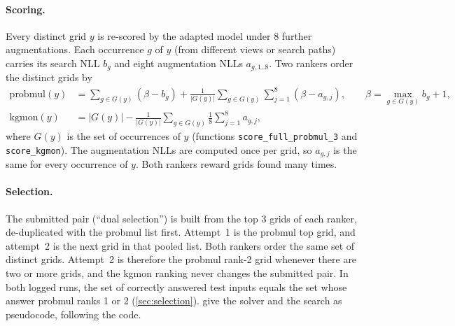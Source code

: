 \documentclass[11pt]{article}
\newcommand{\code}[1]{\texttt{#1}}
\begin{document}
\paragraph{Scoring.}
Every distinct grid $y$ is re-scored by the adapted model under 8 further augmentations. Each occurrence $g$ of $y$ (from different views or search paths) carries its search NLL $b_g$ and eight augmentation NLLs $a_{g,1..8}$.
Two rankers order the distinct grids by
\begin{align}
\text{probmul}(y) &= \sum_{g\in G(y)} (\beta - b_g) + \frac{1}{|G(y)|}\sum_{g\in G(y)}\sum_{j=1}^{8} (\beta - a_{g,j}), \qquad \beta = \max_{g\in G(y)} b_g + 1, \label{eq:probmul}\\
\text{kgmon}(y) &= |G(y)| - \frac{1}{|G(y)|}\sum_{g\in G(y)} \frac{1}{8}\sum_{j=1}^{8} a_{g,j}, \label{eq:kgmon}
\end{align}
where $G(y)$ is the set of occurrences of $y$ (functions \code{score\_full\_probmul\_3} and \code{score\_kgmon}). The augmentation NLLs are computed once per grid, so $a_{g,j}$ is the same for every occurrence of $y$. Both rankers reward grids found many times.

\paragraph{Selection.}
The submitted pair (``dual selection'') is built from the top 3 grids of each ranker, de-duplicated with the probmul list first. Attempt~1 is the probmul top grid, and attempt~2 is the next grid in that pooled list.
Both rankers order the same set of distinct grids. Attempt~2 is therefore the probmul rank-2 grid whenever there are two or more grids, and the kgmon ranking never changes the submitted pair.
In both logged runs, the set of correctly answered test inputs equals the set whose answer probmul ranks 1 or 2 (\cref{sec:selection}).
 give the solver and the search as pseudocode, following the code.
\end{document}
